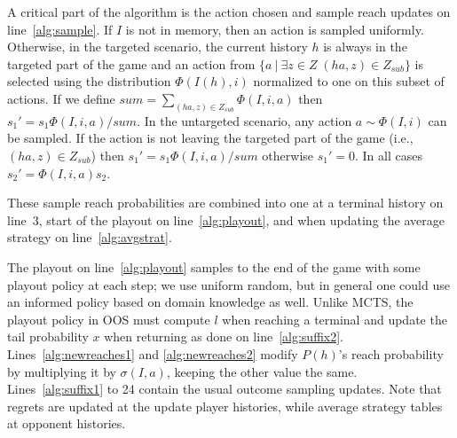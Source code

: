 \documentclass{aamas2015}
\begin{document}
A critical part of the algorithm is the action chosen and sample reach updates on line~\ref{alg:sample}. If $I$ is not in memory, then an action is sampled uniformly. Otherwise, in the targeted scenario, the current history $h$ is always in the targeted part of the game and an action from $\{a~|~\exists z\in Z \; (ha,z)\in Z_{sub}\}$ is selected using the distribution $\Phi(I(h),i)$ normalized to one on this subset of actions. If we define $sum=\sum_{(ha,z)\in Z_{sub}}\Phi(I,i,a)$ then $s_1' = s_1\Phi(I,i,a)/sum$. In the untargeted scenario, any action $a \sim \Phi(I,i)$ can be sampled. If the action is not leaving the targeted part of the game (i.e., $(ha,z)\in Z_{sub}$) then $s_1' = s_1\Phi(I,i,a)/sum$ otherwise $s_1'=0$. In all cases $s_2' = \Phi(I,i,a) s_2$.

These sample reach probabilities are combined into one at a terminal history on line~3, %
start of the playout on line~\ref{alg:playout}, and when updating the average 
strategy on line~\ref{alg:avgstrat}. 

The playout on line~\ref{alg:playout} samples to the end of the game with some playout policy at each step; we use uniform random, 
but in general one could use an informed policy based on domain knowledge as well. 
Unlike MCTS, the playout policy in OOS must compute $l$ when reaching a terminal and update the tail probability $x$ when returning
as done on line~\ref{alg:suffix2}. Lines~\ref{alg:newreaches1} and \ref{alg:newreaches2} modify $P(h)$'s reach probability 
by multiplying it by $\sigma(I,a)$, keeping the other value the same.
Lines~\ref{alg:suffix1} to 24
contain the usual outcome sampling updates. Note that regrets are updated at the 
update player histories, while average strategy tables at opponent histories. \\

\end{document}
